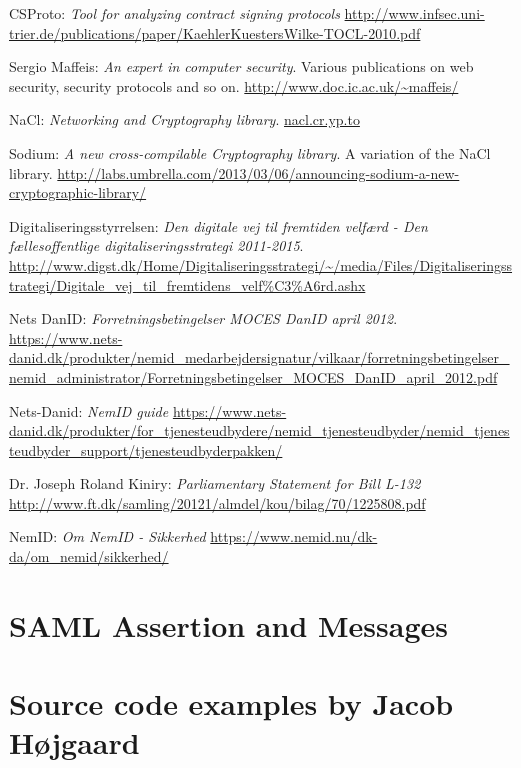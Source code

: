 \documentclass[twosided]{report}
\begin{document}
\begin{thebibliography}{9}
 CSProto:
 \emph{Tool for analyzing contract signing protocols}
 \url{http://www.infsec.uni-trier.de/publications/paper/KaehlerKuestersWilke-TOCL-2010.pdf}

 Sergio Maffeis:
 \emph{An expert in computer security}.
 Various publications on web security, security protocols and so on.
 \url{http://www.doc.ic.ac.uk/~maffeis/}

 NaCl:
 \emph{Networking and Cryptography library}.
 \url{nacl.cr.yp.to}

 Sodium:
 \emph{A new cross-compilable Cryptography library}.
 A variation of the NaCl library.
 \url{http://labs.umbrella.com/2013/03/06/announcing-sodium-a-new-cryptographic-library/}

 Digitaliseringsstyrrelsen:
 \emph{Den digitale vej til fremtiden velf{\ae}rd - Den f{\ae}llesoffentlige digitaliseringsstrategi 2011-2015}.
 \url{http://www.digst.dk/Home/Digitaliseringsstrategi/~/media/Files/Digitaliseringsstrategi/Digitale_vej_til_fremtidens_velf\%C3\%A6rd.ashx}

 Nets DanID:
 \emph{Forretningsbetingelser MOCES DanID april 2012}.
 \url{https://www.nets-danid.dk/produkter/nemid_medarbejdersignatur/vilkaar/forretningsbetingelser_nemid_administrator/Forretningsbetingelser_MOCES_DanID_april_2012.pdf}

 Nets-Danid:
 \emph{NemID guide}
 \url{https://www.nets-danid.dk/produkter/for_tjenesteudbydere/nemid_tjenesteudbyder/nemid_tjenesteudbyder_support/tjenesteudbyderpakken/}

 Dr. Joseph Roland Kiniry:
 \emph{Parliamentary Statement for Bill L-132}
 \url{http://www.ft.dk/samling/20121/almdel/kou/bilag/70/1225808.pdf}

 NemID:
 \emph{Om NemID - Sikkerhed}
 \url{https://www.nemid.nu/dk-da/om_nemid/sikkerhed/}

\end{thebibliography}

\appendix
\chapter{SAML Assertion and Messages}

\chapter{Source code examples by Jacob H{\o}jgaard}
\end{document}
